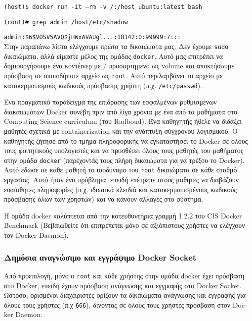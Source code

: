 \texttt{\textlatin{(host)\$ docker run -it --rm -v /:/host ubuntu:latest bash}}

\texttt{\textlatin{(cont)\# grep admin /host/etc/shadow}}

\texttt{\textlatin{admin:\$6\$VOSV5AVQ\$jHWxAVAUgl...:18142:0:99999:7:::}} \\


Στην παραπάνω λίστα ελέγχουμε πρώτα τα δικαιώματα μας. Δεν έχουμε
\texttt{\textlatin{sudo}} δικαιώματα, αλλά είμαστε μέλος της ομάδας
\texttt{\textlatin{docker}}. Αυτό μας επιτρέπει να δημιουργήσουμε ένα κοντέινερ
με / προσαρτημένο ως \textlatin{volume} και αποκτήσoυμε πρόσβαση σε οποιοδήποτε
αρχείο ως \texttt{\textlatin{root}}.
Αυτό περιλαμβάνει το αρχείο με κατακερματισμούς κωδικούς πρόσβασης χρήστη
(π.χ. \texttt{\textlatin{/etc/passwd}}).

Ένα πραγματικό παράδειγμα της επίδρασης των εσφαλμένων ρυθμισμένων διακαιωμάτων
\textlatin{Docker} συνέβη πριν από λίγα χρόνια με ένα από τα μαθήματα στο
\textlatin{Computing Science curriculum} (του \textlatin{Radboud}). Ένα
καθηγητής ήθελε να διδάξει μαθητές σχετικά με \textlatin{containerization} και
την ανάπτυξη σύγχρονου λογισμικού. Ο καθηγητής ζήτησε από το τμήμα πληροφορικής
να εγκαταστήσει το \textlatin{Docker} σε όλους τους φοιτητικούς υπολογιστές και
να προσθέσει όλους τους μαθητές του μαθήματος στην ομάδα
\texttt{\textlatin{docker}} (παρέχοντάς τους πλήρη δικαιώματα για να τρέξου το
\textlatin{Docker}). Αυτό έδωσε σε κάθε μαθητή το ισοδύναμο του
\texttt{\textlatin{root}} δικαιώματα σε κάθε σταθμό εργασίας. Αυτό ήταν ένα
πρόβλημα, επειδή επέτρεπε στους μαθητές να διαβάζουν ευαίσθητες πληροφορίες
(π.χ. ιδιωτικά κλειδιά και κατακερματισμένους κωδικούς πρόσβασης όλων των
χρηστών) και να κάνουν αλλαγές στο σύστημα.

Η ομάδα docker καλύπτεται από την κατευθυντήρια γραμμή 1.2.2 του
\textlatin{CIS Docker Benchmark} (Βεβαιωθείτε ότι επιτρέπεται μόνο σε
αξιόπιστους χρήστες να ελέγχουν τον \textlatin{Docker Daemon}).

\subsubsection{Δημόσια αναγνώσιμο και εγγράψιμο \textlatin{Docker Socket}}

Από προεπιλογή, μόνο ο \texttt{\textlatin{root}} και κάθε χρήστης στην ομάδα
\textlatin{docker} έχει πρόσβαση στο \textlatin{Docker}, επειδή έχουν πρόσβαση
ανάγνωσης και εγγραφής στο \textlatin{Docker Socket}. Ωστόσο, ορισμένοι
διαχειριστές ορίζουν τα δικαιώματα ανάγνωσης και εγγραφής για όλους τους χρήστες
(π.χ \texttt{666}), δίνοντας σε όλους τους χρήστες πρόσβαση στον
\textlatin{Docker Daemon}. \\

